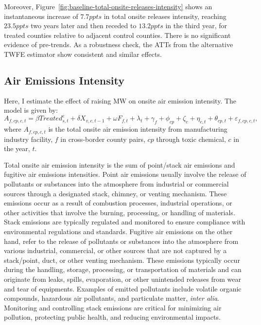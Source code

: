 \documentclass{C:/Users/david/OneDrive/Documents/ULMS/PhD/Thesis/chapter3/src/climate_change/latex/Economic_Journal/OUP-EJ}
\begin{document}
    Moreover, Figure~\ref{fig:baseline-total-onsite-releases-intensity} shows an instantaneous increase of $7.7ppts$ in total onsite releases intensity, reaching $23.5ppts$ two years later and then receded to $13.2ppts$ in the third year, for treated counties relative to adjacent control counties. There is no significant evidence of pre-trends. As a robustness check, the ATTs from the alternative TWFE estimator show consistent and similar effects.

    \subsection{Air Emissions Intensity}\label{subsec:air-emission-intensity}
    Here, I estimate the effect of raising MW on onsite air emission intensity. The model is given by:
    \begin{equation}
        A_{f,cp,c,t} = \beta Treated_{s,t}^e + \delta X_{v,c,t-1} + \omega F_{f,t} + \lambda_{t} + \gamma_{f} + \phi_{cp} + \zeta_{c} + \eta_{c,t} + \theta_{cp,t} + \varepsilon_{f,cp,c,t},\label{eq:baseline-onsite-air-emission-intensity}
    \end{equation}
    where $A_{f,cp,c,t}$ is the total onsite air emission intensity from manufacturing industry facility, $f$ in cross-border county pairs, $cp$ through toxic chemical, $c$ in the year, $t$.

    Total onsite air emission intensity is the sum of point/stack air emissions and fugitive air emissions intensities. Point air emissions usually involve the release of pollutants or substances into the atmosphere from industrial or commercial sources through a designated stack, chimney, or venting mechanism. These emissions occur as a result of combustion processes, industrial operations, or other activities that involve the burning, processing, or handling of materials. Stack emissions are typically regulated and monitored to ensure compliance with environmental regulations and standards. Fugitive air emissions on the other hand, refer to the release of pollutants or substances into the atmosphere from various industrial, commercial, or other sources that are not captured by a stack/point, duct, or other venting mechanism. These emissions typically occur during the handling, storage, processing, or transportation of materials and can originate from leaks, spills, evaporation, or other unintended releases from wear and tear of equipments. Examples of emitted pollutants include volatile organic compounds, hazardous air pollutants, and particulate matter, \textit{inter alia}. Monitoring and controlling stack emissions are critical for minimizing air pollution, protecting public health, and reducing environmental impacts.
    
\end{document}
